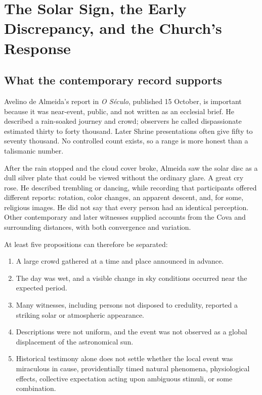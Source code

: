 \section{The Solar Sign, the Early Discrepancy, and the Church's Response}

\subsection{What the contemporary record supports}

Avelino de Almeida's report in \emph{O Século}, published 15 October, is important because it was near-event, public, and not written as an ecclesial brief. He described a rain-soaked journey and crowd; observers he called dispassionate estimated thirty to forty thousand. Later Shrine presentations often give fifty to seventy thousand. No controlled count exists, so a range is more honest than a talismanic number.

After the rain stopped and the cloud cover broke, Almeida saw the solar disc as a dull silver plate that could be viewed without the ordinary glare. A great cry rose. He described trembling or dancing, while recording that participants offered different reports: rotation, color changes, an apparent descent, and, for some, religious images. He did not say that every person had an identical perception. Other contemporary and later witnesses supplied accounts from the Cova and surrounding distances, with both convergence and variation.

At least five propositions can therefore be separated:

\begin{enumerate}
  \item A large crowd gathered at a time and place announced in advance.
  \item The day was wet, and a visible change in sky conditions occurred near the expected period.
  \item Many witnesses, including persons not disposed to credulity, reported a striking solar or atmospheric appearance.
  \item Descriptions were not uniform, and the event was not observed as a global displacement of the astronomical sun.
  \item Historical testimony alone does not settle whether the local event was miraculous in cause, providentially timed natural phenomena, physiological effects, collective expectation acting upon ambiguous stimuli, or some combination.
\end{enumerate}

